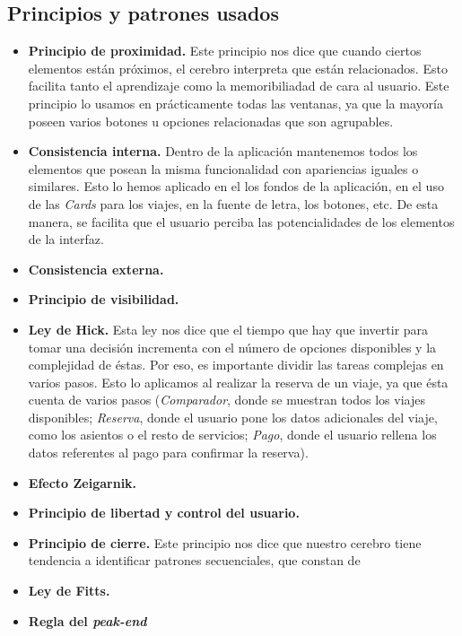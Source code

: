 \subsection{Principios y patrones usados}

\begin{itemize}

      \item \textbf{Principio de proximidad.} Este principio nos dice que cuando ciertos elementos están próximos, el cerebro interpreta
            que están relacionados. Esto facilita tanto el aprendizaje como la memoribiliadad de cara al usuario. Este principio lo usamos en prácticamente
            todas las ventanas, ya que la mayoría poseen varios botones u opciones relacionadas que son agrupables.
      \item \textbf{Consistencia interna.} Dentro de la aplicación mantenemos todos los elementos que posean la misma funcionalidad con apariencias iguales
            o similares. Esto lo hemos aplicado en el los fondos de la aplicación, en el uso de las \textit{Cards} para los viajes, en la fuente de letra, los
            botones, etc. De esta manera, se facilita que el usuario perciba las potencialidades de los elementos de la interfaz.
      \item \textbf{Consistencia externa.} 
      \item \textbf{Principio de visibilidad.}
      \item \textbf{Ley de Hick.} Esta ley nos dice que el tiempo que hay que invertir para tomar una decisión incrementa con el número de opciones disponibles y la complejidad
            de éstas. Por eso, es importante dividir las tareas complejas en varios pasos. Esto lo aplicamos al realizar la reserva de un viaje, ya que ésta cuenta de varios
            pasos (\textit{Comparador}, donde se muestran todos los viajes disponibles; \textit{Reserva}, donde el usuario pone los datos adicionales del viaje, como los asientos
            o el resto de servicios; \textit{Pago}, donde el usuario rellena los datos referentes al pago para confirmar la reserva).
      \item \textbf{Efecto Zeigarnik.}
      \item \textbf{Principio de libertad y control del usuario.}
      \item \textbf{Principio de cierre.} Este principio nos dice que nuestro cerebro tiene tendencia a identificar patrones secuenciales, que constan de 
      \item \textbf{Ley de Fitts.} 
      \item \textbf{Regla del \textit{peak-end}}

\end{itemize}
